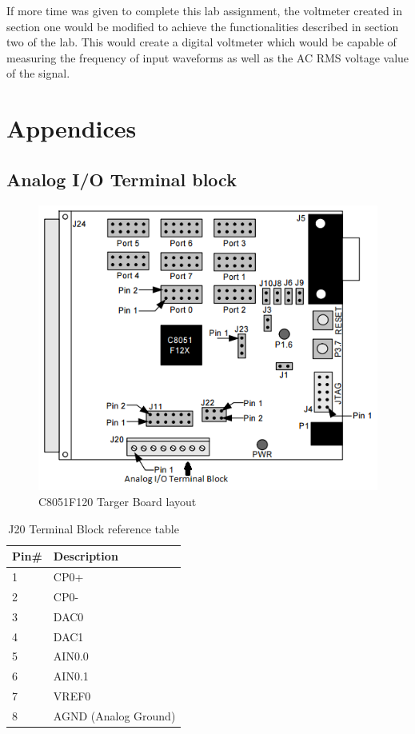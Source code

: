 \documentclass[12pt]{article}
\begin{document}
If more time was given to complete this lab assignment, the voltmeter created in section one would be modified to achieve the functionalities described in section two of the lab. This would create a digital voltmeter which would be capable of measuring the frequency of input waveforms as well as the AC RMS voltage value of the signal. 



\pagebreak
\section{Appendices}
\subsection{Analog I/O Terminal block}
	\begin{figure}[H]
		\centering
		\includegraphics[]{board.png}
		\caption{C8051F120 Targer Board layout}
		\label{board layout}
	\end{figure} 
	\begin{table}[h]
		\centering
		\begin{tabular}{|l|l|}
			\hline
			Pin\# & Description \\ \hline
			1 & CP0+\\ \hline
			2 & CP0-\\ \hline
			3 & DAC0\\ \hline
			4 & DAC1\\ \hline
			5 & AIN0.0\\ \hline
			6 & AIN0.1\\ \hline
			7 & VREF0\\ \hline
			8 & AGND (Analog Ground)\\ \hline
		\end{tabular}
		\caption{J20 Terminal Block reference table}
		\label{refTable}
	\end{table}
\end{document}
